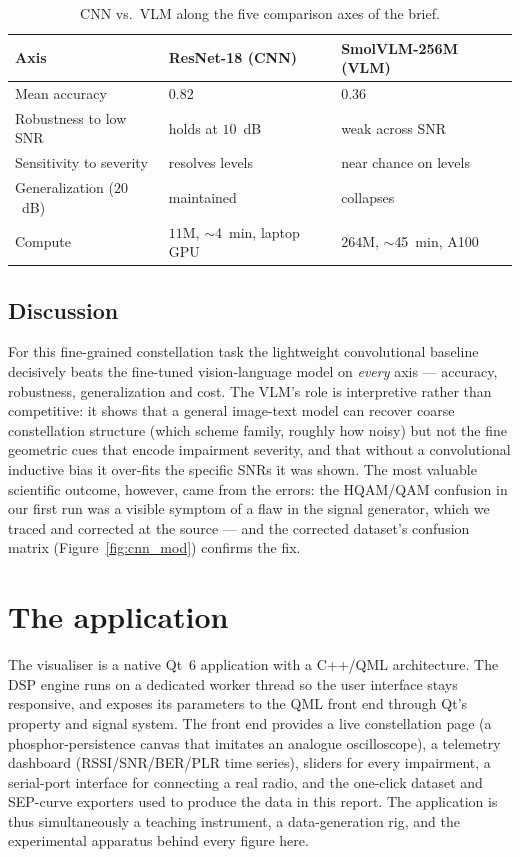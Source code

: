 \documentclass[11pt,a4paper,onecolumn,final]{article}
\begin{document}
\begin{table}[htbp]
\centering
\caption{CNN vs.\ VLM along the five comparison axes of the brief.}
\label{tab:compare}
\begin{tabular}{lll}
\hline
Axis & ResNet-18 (CNN) & SmolVLM-256M (VLM)\\
\hline
Mean accuracy            & $0.82$ & $0.36$\\
Robustness to low SNR    & holds at $10$~dB & weak across SNR\\
Sensitivity to severity  & resolves levels & near chance on levels\\
Generalization ($20$~dB) & maintained & collapses\\
Compute                  & $11$M, $\sim$4~min, laptop GPU & $264$M, $\sim$45~min, A100\\
\hline
\end{tabular}
\end{table}

\subsection{Discussion}
For this fine-grained constellation task the lightweight convolutional baseline decisively
beats the fine-tuned vision-language model on \emph{every} axis --- accuracy, robustness,
generalization and cost. The VLM's role is interpretive rather than competitive: it shows that
a general image-text model can recover coarse constellation structure (which scheme family,
roughly how noisy) but not the fine geometric cues that encode impairment severity, and that
without a convolutional inductive bias it over-fits the specific SNRs it was shown. The most
valuable scientific outcome, however, came from the errors: the HQAM/QAM confusion in our
first run was a visible symptom of a flaw in the signal generator, which we traced and
corrected at the source --- and the corrected dataset's confusion matrix
(Figure~\ref{fig:cnn_mod}) confirms the fix.

\section{The application}
The visualiser is a native Qt~6 application with a C++/QML architecture. The DSP engine runs
on a dedicated worker thread so the user interface stays responsive, and exposes its
parameters to the QML front end through Qt's property and signal system. The front end
provides a live constellation page (a phosphor-persistence canvas that imitates an analogue
oscilloscope), a telemetry dashboard (RSSI/SNR/BER/PLR time series), sliders for every
impairment, a serial-port interface for connecting a real radio, and the one-click dataset
and SEP-curve exporters used to produce the data in this report. The application is thus
simultaneously a teaching instrument, a data-generation rig, and the experimental apparatus
behind every figure here.
\end{document}
